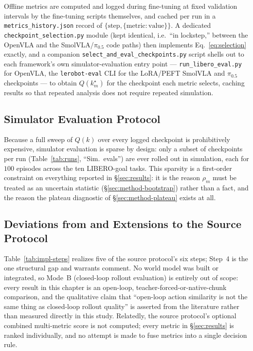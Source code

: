 \documentclass[11pt]{article}
\numberwithin{equation}{section}
\numberwithin{table}{section}
\numberwithin{figure}{section}
\begin{document}
Offline metrics are computed and logged during fine-tuning at fixed validation intervals by the
fine-tuning scripts themselves, and cached per run in a \texttt{metrics\_history.json} record of
$\{\text{step}, \{\text{metric}:\text{value}\}\}$. A dedicated \texttt{checkpoint\_selection.py} module
(kept identical, i.e.\ ``in lockstep,'' between the OpenVLA and the SmolVLA/$\pi_{0.5}$ code paths) then
implements Eq.~\ref{eq:selection} exactly, and a companion \texttt{select\_and\_eval\_checkpoints.py}
script shells out to each framework's own simulator-evaluation entry point --- \texttt{run\_libero\_eval.py}
for OpenVLA, the \texttt{lerobot-eval} CLI for the LoRA/PEFT SmolVLA and $\pi_{0.5}$ checkpoints --- to
obtain $Q(k_m^\star)$ for the checkpoint each metric selects, caching results so that repeated analysis
does not require repeated simulation.

\subsection{Simulator Evaluation Protocol}
\label{sec:implementation-sim}

Because a full sweep of $Q(k)$ over every logged checkpoint is prohibitively expensive, simulator
evaluation is sparse by design: only a subset of checkpoints per run (Table~\ref{tab:runs}, ``Sim.\
evals'') are ever rolled out in simulation, each for $100$ episodes across the ten LIBERO-goal tasks.
This sparsity is a first-order constraint on everything reported in \S\ref{sec:results}: it is the reason
$\rho_m$ must be treated as an uncertain statistic (\S\ref{sec:method-bootstrap}) rather than a fact, and
the reason the plateau diagnostic of \S\ref{sec:method-plateau} exists at all.

\subsection{Deviations from and Extensions to the Source Protocol}
\label{sec:implementation-deviations}

Table~\ref{tab:impl-steps} realizes five of the source protocol's six steps; Step~4 is the one
structural gap and warrants comment. No world model was built or integrated, so Mode~B (closed-loop
rollout evaluation) is entirely out of scope: every result in this chapter is an open-loop,
teacher-forced-or-native-chunk comparison, and the qualitative claim that ``open-loop action similarity
is not the same thing as closed-loop rollout quality'' is asserted from the literature rather than
measured directly in this study. Relatedly, the source protocol's optional combined multi-metric score
is not computed; every metric in \S\ref{sec:results} is ranked individually, and no attempt is made to
fuse metrics into a single decision rule.
\end{document}
